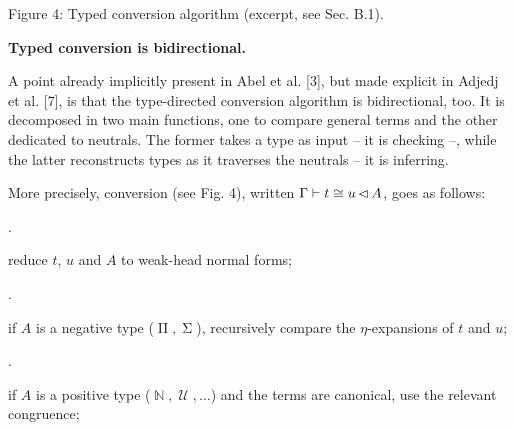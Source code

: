 \documentclass[10pt,a4paper]{amsart}
\begin{document}
Figure 4:   Typed conversion algorithm (excerpt, see Sec. B.1).\par
 
 
 
 
\par\medskip\noindent\textbf{Typed conversion is bidirectional.}\par
 
 
A point already implicitly present in Abel et al. [3], but made explicit in Adjedj et al. [7], is that the type-directed conversion algorithm is bidirectional, too. It is decomposed in two main functions, one to compare general terms and the other dedicated to neutrals. The former takes a type as input – it is checking –, while the latter reconstructs types as it traverses the neutrals – it is inferring.\par
 
 
 
More precisely, conversion (see Fig. 4), written $\Gamma\vdash t\mathrel{\raisebox{-0.5pt}{$\cong$}}u\operatorname{\mathrel{\lhd%
}}A$, goes as follows:\par
  
\par{}. 
 
reduce $t$, $u$ and $A$ to weak-head normal forms;\par
 
 
 
\par{}. 
 
if $A$ is a negative type ($\operatorname{\Pi},\operatorname{\Sigma}$), recursively compare the $\eta$-expansions of $t$ and $u$;\par
 
 
 
\par{}. 
 
if $A$ is a positive type ($\operatorname{\mathbb{N}},\operatorname{\mathcal{U}},\dots$) and the terms are canonical, use the relevant congruence;\par
 
 
\end{document}
